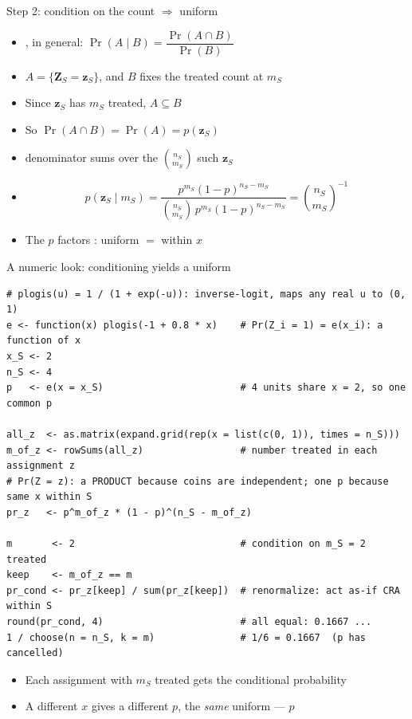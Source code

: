 \documentclass[table, xcolor = {dvipsnames}, 9pt]{beamer}
\theoremstyle{plain}
\newcommand{\mh}[1]{{\color{magenta}{#1}}}
\begin{document}
\begin{frame}[t]{Step 2: condition on the count $\Rightarrow$ uniform}
\vfill
\begin{itemize} \vfill
\item \mh{Conditional probability}, in general: $\Pr(A \mid B) = \dfrac{\Pr(A \cap B)}{\Pr(B)}$ \vfill
\item $A = \{\bm{Z}_S = \bm{z}_S\}$, and $B$ fixes the treated count at $m_S$ \vfill 
\item[] Since $\bm{z}_S$ has $m_S$ treated, $A \subseteq B$ \vfill
\item So $\Pr(A \cap B) = \Pr(A) = p(\bm{z}_S)$ \vfill
\item[] denominator sums over the $\binom{n_S}{m_S}$ such $\bm{z}_S$ \vfill
\item[]
\begin{equation*}
p(\bm{z}_S \mid m_S) = \frac{p^{m_S}(1-p)^{n_S-m_S}}{\binom{n_S}{m_S}\, p^{m_S}(1-p)^{n_S-m_S}} = \binom{n_S}{m_S}^{-1}
\end{equation*} \vfill
\item The $p$ factors \mh{cancel}: uniform $=$ \mh{complete random assignment} within $x$ \vfill
\end{itemize} \vfill
\end{frame}
\begin{frame}[fragile]{A numeric look: conditioning yields a uniform}
\begin{lstlisting}[style=Rstyle, basicstyle=\ttfamily\tiny, frame=single]
# plogis(u) = 1 / (1 + exp(-u)): inverse-logit, maps any real u to (0, 1)
e <- function(x) plogis(-1 + 0.8 * x)    # Pr(Z_i = 1) = e(x_i): a function of x
x_S <- 2
n_S <- 4
p   <- e(x = x_S)                        # 4 units share x = 2, so one common p

all_z  <- as.matrix(expand.grid(rep(x = list(c(0, 1)), times = n_S)))
m_of_z <- rowSums(all_z)                 # number treated in each assignment z
# Pr(Z = z): a PRODUCT because coins are independent; one p because same x within S
pr_z   <- p^m_of_z * (1 - p)^(n_S - m_of_z)

m       <- 2                             # condition on m_S = 2 treated
keep    <- m_of_z == m
pr_cond <- pr_z[keep] / sum(pr_z[keep])  # renormalize: act as-if CRA within S
round(pr_cond, 4)                        # all equal: 0.1667 ...
1 / choose(n = n_S, k = m)               # 1/6 = 0.1667  (p has cancelled)
\end{lstlisting}
\begin{itemize} \vfill
\item Each assignment with $m_S$ treated gets the \mh{same} conditional probability \vfill
\item A different $x$ gives a different $p$, the \emph{same} uniform --- $p$ \mh{cancels} \vfill
\end{itemize}
\end{frame}
\end{document}
